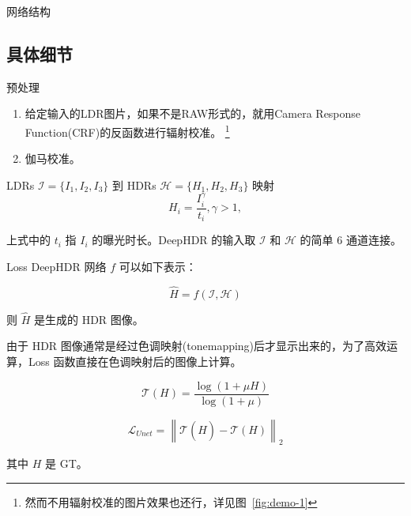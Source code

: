 \documentclass{beamer}
\newcommand{\norm}[1]{\left\lVert#1\right\rVert}
\begin{document}
    \begin{frame}{网络结构}
    \end{frame}

    \subsection{具体细节}

    \begin{frame}{预处理}
        \begin{enumerate}
            \item 给定输入的LDR图片，如果不是RAW形式的，就用Camera Response Function(CRF)的反函数进行辐射校准。
            \footnote{然而不用辐射校准的图片效果也还行，详见图~\ref{fig:demo-1}}
            \item 伽马校准。
        \end{enumerate}

        \pause
        \begin{block}{LDRs $\mathcal{I}=\{I_1,I_2,I_3\}$ 到 HDRs $\mathcal{H}=\{H_1,H_2,H_3\}$ 映射}
            $$H_i=\frac{I_i^\gamma}{t_i}, \gamma > 1, $$
        \end{block}

        \pause
        上式中的 $t_i$ 指 $I_i$ 的曝光时长。DeepHDR 的输入取 $\mathcal{I}$ 和 $\mathcal{H}$ 的简单 6 通道连接。
    \end{frame}

    \begin{frame}{Loss}
        DeepHDR 网络 $f$ 可以如下表示：

        $$\hat{H} = f(\mathcal{I}, \mathcal{H})$$

        则 $\hat{H}$ 是生成的 HDR 图像。

        由于 HDR 图像通常是经过色调映射(tonemapping)后才显示出来的，为了高效运算，Loss 函数直接在色调映射后的图像上计算。

        $$\mathcal{T}(H) = \frac{\log(1+\mu H)}{\log(1+\mu)}$$

        $$\mathcal{L}_{Unet} = \norm{\mathcal{T}(\hat{H}) - \mathcal{T}(H)}_2$$

        其中 $H$ 是 GT。

    \end{frame}
\end{document}
